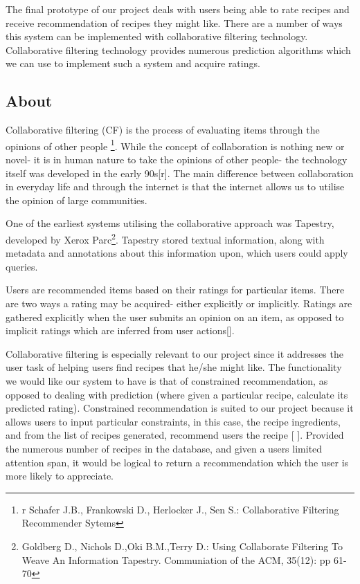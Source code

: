 The final prototype of our project deals with users being able to rate recipes and receive recommendation of recipes they might like. There are a number of ways this system can be implemented with collaborative filtering technology. Collaborative filtering technology provides numerous prediction algorithms which we can use to implement such a system and acquire ratings.

\subsection{About}

Collaborative filtering (CF) is the process of evaluating items through the opinions of other people \footnote{r  Schafer J.B., Frankowski D., Herlocker J., Sen S.: Collaborative Filtering Recommender Sytems}. While the concept of collaboration is nothing new or novel- it is in human nature to take the opinions of other people- the technology itself was developed in the early 90s[r]. The main difference between collaboration in everyday life and through the internet is that the internet allows us to utilise the opinion of large communities. 

One of the earliest systems utilising the collaborative approach was Tapestry, developed by Xerox Parc\footnote{Goldberg D., Nichols D.,Oki B.M.,Terry D.: Using Collaborate Filtering To Weave An Information Tapestry. Communiation of the ACM, 35(12): pp 61-70}. Tapestry stored textual information, along with metadata and annotations about this information upon, which users could apply queries.

Users are recommended items based on their ratings for particular items. There are two ways a rating may be acquired- either explicitly or implicitly. Ratings are gathered explicitly when the user submits an opinion on an item, as opposed to implicit ratings which are inferred from user actions[].

Collaborative filtering is especially relevant to our project since it addresses the user task of helping users find recipes that he/she might like. The functionality we would like our system to have is that of constrained recommendation, as opposed to dealing with prediction (where given a particular recipe, calculate its predicted rating). Constrained recommendation is suited to our project because it allows users to input particular constraints, in this case, the recipe ingredients, and from the list of recipes generated, recommend users the recipe [ ]. Provided the numerous number of recipes in the database, and given a users limited attention span, it would be logical to return a recommendation which the user is more likely to appreciate.


